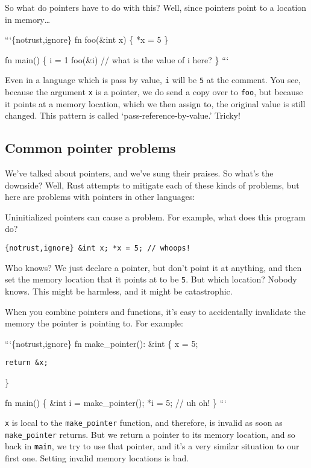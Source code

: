 \documentclass[]{article}
\begin{document}
So what do pointers have to do with this? Well, since pointers point to
a location in memory\ldots{}

```\{notrust,ignore\} fn foo(\&int x) \{ *x = 5 \}

fn main() \{ i = 1 foo(\&i) // what is the value of i here? \} ```

Even in a language which is pass by value, \texttt{i} will be \texttt{5}
at the comment. You see, because the argument \texttt{x} is a pointer,
we do send a copy over to \texttt{foo}, but because it points at a
memory location, which we then assign to, the original value is still
changed. This pattern is called `pass-reference-by-value.' Tricky!

\subsection{Common pointer problems}\label{common-pointer-problems}

We've talked about pointers, and we've sung their praises. So what's the
downside? Well, Rust attempts to mitigate each of these kinds of
problems, but here are problems with pointers in other languages:

Uninitialized pointers can cause a problem. For example, what does this
program do?

\texttt{\{notrust,ignore\} \&int x; *x = 5; // whoops!}

Who knows? We just declare a pointer, but don't point it at anything,
and then set the memory location that it points at to be \texttt{5}. But
which location? Nobody knows. This might be harmless, and it might be
catastrophic.

When you combine pointers and functions, it's easy to accidentally
invalidate the memory the pointer is pointing to. For example:

```\{notrust,ignore\} fn make\_pointer(): \&int \{ x = 5;

\begin{verbatim}
return &x;
\end{verbatim}

\}

fn main() \{ \&int i = make\_pointer(); *i = 5; // uh oh! \} ```

\texttt{x} is local to the \texttt{make\_pointer} function, and
therefore, is invalid as soon as \texttt{make\_pointer} returns. But we
return a pointer to its memory location, and so back in \texttt{main},
we try to use that pointer, and it's a very similar situation to our
first one. Setting invalid memory locations is bad.
\end{document}
